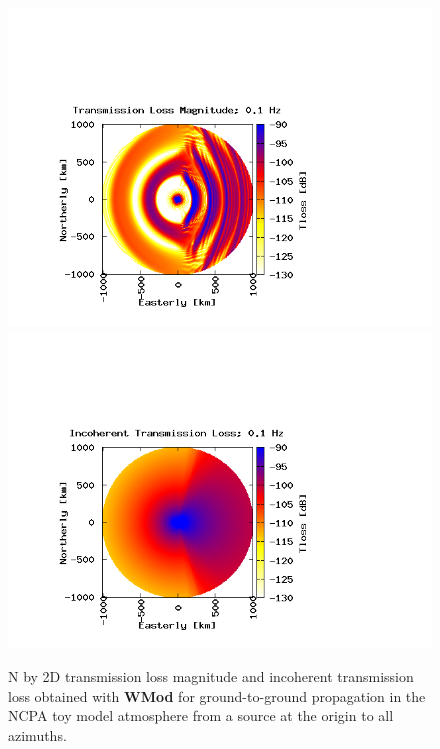 \begin{figure}[h]
\begin{center}
\includegraphics[scale=0.45,trim = 70 20 180 140,clip]{figs/wmod_ex3}
\includegraphics[scale=0.45,trim = 70 20 180 140,clip]{figs/wmod_ex3_inco}
\end{center}
\caption{N by 2D transmission loss magnitude and incoherent transmission loss obtained with {\bf WMod} for ground-to-ground propagation in the NCPA toy model atmosphere from a source at the origin to all azimuths.}
\label{fig: wmod Nby2D tl}
\end{figure}

